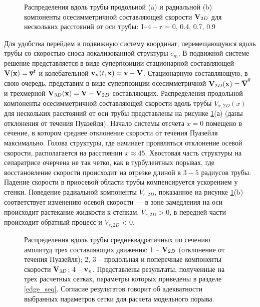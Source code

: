 \begin{figure}
\caption{Распределения вдоль трубы продольной (a) и радиальной (b) компоненты осесимметричной составляющей скорости $\mathbf{V}_{2D}$ для нескольких расстояний от оси трубы: 1–4 – r = 0, 0.4, 0.7, 0.9}
\label{U2D_pic}
\end{figure}

Для удобства перейдем в подвижную систему координат, перемещающуюся вдоль трубы со скоростью сноса локализованной структуры $c_m$. В подвижной системе решение представляется в виде суперпозиции стационарной составляющей $\mathbf{V}(\mathbf{x}) = \overline{\mathbf{v}}^t$ и колебательной $\mathbf{v}_n(t,\mathbf{x}) = \mathbf{v} - \mathbf{V}$. Стационарную составляющую, в свою очередь, представим в виде суперпозиции осесимметричной $\mathbf{V}_{2D}(\mathbf{x}) = \overline{\mathbf{V}}^{\theta}$ и трехмерной $\mathbf{V}_{3D}(\mathbf{x}) = \mathbf{V} - \mathbf{V}_{2D}$ составляющих. Распределения продольной компоненты осесимметричной составляющей скорости вдоль трубы $V_{x,2D}(x)$ для нескольких расстояний от оси трубы представлены на рисунке \ref{U2D_pic}(а) (даны отклонения от течения Пуазейля). Начало системы отсчета $x=0$ помещено в сечение, в котором среднее отклонение скорости от течения Пуазейля максимально. Голова структуры, где начинает проявляться отклонение осевой скорости, располагается на расстоянии $x \approx 45$. Хвостовая часть структуры на сепаратрисе очерчена не так четко, как в турбулентных порывах, где восстановление скорости происходит на отрезке длиной в $3-5$ радиусов трубы.  Падение скорости в приосевой области трубы компенсируется ускорением у стенки. Поведение радиальной компоненты $V_{r,2D}$, показанное на рисунке \ref{U2D_pic}(b) соответствует изменению осевой скорости --- в зоне замедления на оси происходит растекание жидкости к стенкам, $V_{r,2D}>0$, в передней части происходит обратный процесс и $V_{r,2D}<0$.

\begin{figure}
\caption{Распределения вдоль трубы среднеквадратичных по сечению амплитуд трех составляющих движения: 1 -- $\mathbf{V}_{2D}$ (отклонение от течения Пуазейля); 2, 3 -- продольная и поперечные компоненты скорости $\mathbf{V}_{3D}$; 4 -- $\mathbf{v}_{n}$. Представлены результаты, полученные на трех расчетных сетках, параметры которых приведены в разделе \ref{edge_seq}. Согласие результатов говорит об адекватности выбранных параметров сетки для расчета модельного порыва. }
\label{amp_pic}
\end{figure}

